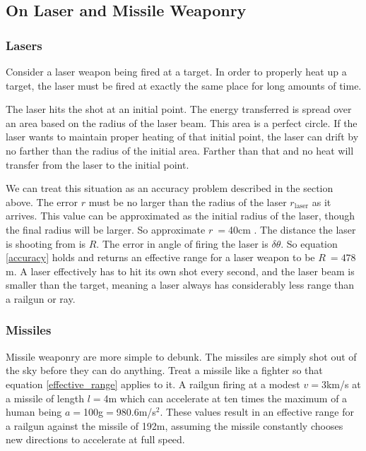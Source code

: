 \documentclass[a4paper]{article}
\begin{document}
\subsection{On Laser and Missile Weaponry}

\subsubsection{Lasers}

Consider a laser weapon being fired at a target. In order to properly heat up a target, the laser must be fired at exactly the same place for long amounts of time.

The laser hits the shot at an initial point. The energy transferred is spread over an area based on the radius of the laser beam. This area is a perfect circle. If the laser wants to maintain proper heating of that initial point, the laser can drift by no farther than the radius of the initial area. Farther than that and no heat will transfer from the laser to the initial point. 

We can treat this situation as an accuracy problem described in the section above. The error $r$ must be no larger than the radius of the laser $r_\text{laser}$ as it arrives. This value can be approximated as the initial radius of the laser, though the final radius will be larger. So approximate $r~=$40cm \cite{strong_laser}. The distance the laser is shooting from is $R$. The error in angle of firing the laser is $\delta\theta$. So equation \ref{accuracy} holds and returns an effective range for a laser weapon to be $R~=478$m. A laser effectively has to hit its own shot every second, and the laser beam is smaller than the target, meaning a laser always has considerably less range than a railgun or ray.

\subsubsection{Missiles}

Missile weaponry are more simple to debunk. The missiles are simply shot out of the sky before they can do anything. Treat a missile like a fighter so that equation \ref{effective_range} applies to it. A railgun firing at a modest $v=$3km/s at a missile of length $l=$4m which can accelerate at ten times the maximum of a human being $a=$100g$=$980.6m/s$^2$. These values result in an effective range for a railgun against the missile of 192m, assuming the missile constantly chooses new directions to accelerate at full speed.
\end{document}
